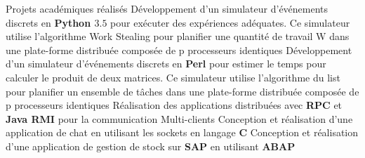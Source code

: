 \begin{rubric}{Projets académiques réalisés}
%
\entry*[]      	Développement d'un simulateur d'événements discrets en \textbf{Python $3.5$} pour exécuter des expériences adéquates. Ce simulateur utilise l'algorithme Work Stealing pour planifier une quantité de travail W dans une plate-forme distribuée composée de p processeurs identiques
\entry*[]	Développement d'un simulateur d'événements discrets en \textbf{Perl} pour estimer le temps pour calculer le produit de deux matrices. Ce simulateur utilise l'algorithme du list pour planifier un ensemble de tâches dans une plate-forme distribuée composée de p processeurs identiques
\entry*[]	Réalisation des applications distribuées avec \textbf{RPC} et \textbf{Java RMI} pour la communication Multi-clients
\entry*[]	Conception et réalisation d’une application de chat en utilisant les sockets en langage \textbf{C}
\entry*[]	Conception et réalisation d’une application de gestion de stock sur \textbf{SAP} en utilisant \textbf{ABAP}
\end{rubric}
